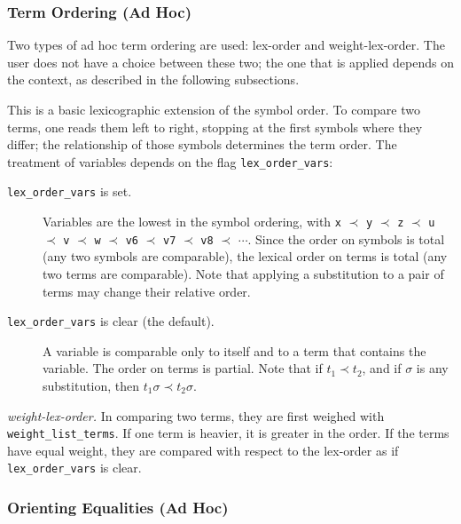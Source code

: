\documentclass[11pt]{article}
\begin{document}
\subsubsection{Term Ordering (Ad Hoc)} \label{lex-order}

Two types of ad hoc term ordering are used: lex-order and weight-lex-order.
The user does not have a choice between these two; the one that is
applied depends on the context, as described in the following subsections.
\begin{description}
\item[{\it lex-order.}]
This is a basic lexicographic extension of the symbol order.  To compare
two terms, one reads them left to right, stopping at the
first symbols where they differ;  the relationship of those symbols
determines the term order.
The treatment of variables depends on 
the flag \verb:lex_order_vars::
\begin{description}
\item[{\tt lex\_order\_vars} is set.]
Variables are the lowest in the symbol ordering, with \verb:x: $\prec$
\verb:y: $\prec$ \verb:z: $\prec$ \verb:u: $\prec$ \verb:v: $\prec$
\verb:w: $\prec$ \verb:v6: $\prec$ \verb:v7: $\prec$ \verb:v8: $\prec$
$\cdots$.  Since the order on symbols is total (any two symbols are
comparable), the lexical order on terms is total (any two terms are
comparable).  Note that applying a substitution to a pair of terms may
change their relative order.
\item[{\tt lex\_order\_vars} is clear (the default).]
A variable is comparable only to itself and to a term that
contains the variable.
The order on terms is partial.  Note that
if $t_1 \prec t_2$, and if $\sigma$ is any substitution, then
$t_1\sigma \prec t_2\sigma$.
\end{description}
\begin{sloppypar}
\item[{\it weight-lex-order.}]
In comparing two terms, they are first weighed with \verb:weight_list_terms:.
If one term is heavier, it is greater in the order.
If the terms have equal weight, they are compared with respect to
the lex-order as if \verb:lex_order_vars: is clear.
\end{sloppypar}
\end{description}

\subsubsection{Orienting Equalities (Ad Hoc)} \label{orient}
\end{document}
